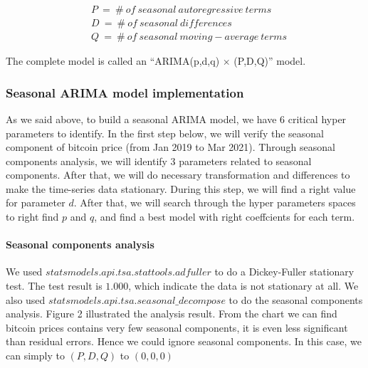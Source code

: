 \documentclass[10pt,twocolumn,letterpaper]{article}
\begin{document}
\begin{equation*}
	\begin{aligned}
	&P\ =\ \#\ of\ seasonal\ autoregressive\ terms \\ 
	&D\ =\ \#\ of\ seasonal\ differences \\  
	&Q\ =\ \#\ of\ seasonal\ moving-average\ terms 
	\end{aligned}
\end{equation*}

\par

The complete model is called an “ARIMA(p,d,q) $\times$ (P,D,Q)” model.

\subsubsection{Seasonal ARIMA model implementation}
\par
As we said above, to build a seasonal ARIMA model, we have 6 critical hyper parameters to identify. In the first step below, we will verify the seasonal component of bitcoin price (from Jan 2019 to Mar 2021). Through seasonal components analysis, we will identify 3 parameters related to seasonal components. After that, we will do necessary transformation and differences to make the time-series data stationary. During this step, we will find a right value for parameter $d$. After that, we will search through the hyper parameters spaces to right find $p$ and $q$, and find a best model with right coeffcients for each term.

\paragraph{Seasonal components analysis}
We used $statsmodels.api.tsa.stattools.adfuller$ to do a Dickey-Fuller stationary test. The test result is $1.000$, which indicate the data is not stationary at all. We also used $statsmodels.api.tsa.seasonal\_decompose$ to do the seasonal components analysis. Figure 2 illustrated the analysis result. From the chart we can find bitcoin prices contains very few seasonal components, it is even less significant than residual errors. Hence we could ignore seasonal components. In this case, we can simply to $(P, D, Q)$ to $(0, 0, 0)$
\end{document}
